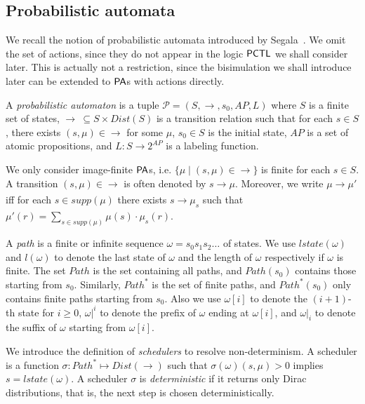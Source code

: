 \documentclass{LMCS}
\newcommand{\TRANA}[3]{#1\xrightarrow[]{#2}#3}
\newcommand{\AP}{\mathit{AP}}
\newcommand{\PA}{{\sf PA}}
\newcommand{\PCTL}{{\sf PCTL}}
\newcommand{\MI}[1]{\mathit{#1}}
\begin{document}
\subsection{Probabilistic automata}
We recall the notion of probabilistic automata introduced by Segala~\cite{Segala-thesis}.  We omit the set of actions, since they do not
appear in the logic $\PCTL$ we shall consider later. This is actually not
a restriction, since the bisimulation we shall introduce later
can be extended to $\PA$s with
actions directly.
\begin{defi}\label{def:automata}
  A \emph{probabilistic automaton} is a tuple
  $\mathcal{P}=(S,\rightarrow,s_0,\AP,L)$ where $S$ is a finite set of
  states, $\rightarrow~\subseteq S\times\MI{Dist}(S)$ is a
  transition relation such that for each $s\in S$, 
  there exists $(s,\mu)\in\rightarrow$ for some $\mu$, 
  $s_0\in S$ is the initial state,
  $\AP$ is a set of atomic propositions, and $L:S\rightarrow
  2^{\mathit{AP}}$ is a labeling function.
\end{defi}
We only consider image-finite $\PA$s, i.e.
$\{\mu\mid (s,\mu)\in\rightarrow\}$ is finite for each $s\in S$. A transition
$(s,\mu)\in\rightarrow$ is often denoted by $\TRANA{s}{}{\mu}$. Moreover, we
write $\TRANA{\mu}{}{\mu'}$ iff for each $s\in\mathit{supp}(\mu)$
there exists $\TRANA{s}{}{\mu_s}$ such that
$\mu'(r)=\sum\limits_{s\in\mathit{supp}(\mu)}\mu(s)\cdot\mu_s(r)$.


A \emph{path} is a finite or infinite sequence
$\omega=s_0s_1s_2\ldots$ of states. 
We use $\mathit{lstate}(\omega)$ and $l(\omega)$ to denote the last
state of $\omega$ and the length of $\omega$ respectively if $\omega$
is finite. The set $\mathit{Path}$ is the set containing all paths, and
$\mathit{Path}(s_0)$ contains those starting from $s_0$. Similarly,
$\mathit{Path}^{*}$ is the set of finite paths, and
$\mathit{Path}^{*}(s_0)$ only contains finite paths starting from $s_0$. Also we use
$\omega[i]$ to denote the $(i+1)$-th state for $i\geq 0$, $\omega|^i$
to denote the prefix of $\omega$ ending at $\omega[i]$, and
$\omega|_i$ to denote the suffix of $\omega$ starting from
$\omega[i]$.

We introduce the definition of \emph{schedulers} to resolve non-determinism.
A scheduler is a
function $\sigma:\mathit{Path}^{*}\mapsto
\mathit{Dist}(\rightarrow)$ such that
$\sigma(\omega)(s,\mu)>0$ implies
$s=\mathit{lstate}(\omega)$. A scheduler $\sigma$ is
\emph{deterministic} if it returns only Dirac distributions, that
is, the next step is chosen deterministically.
\end{document}
